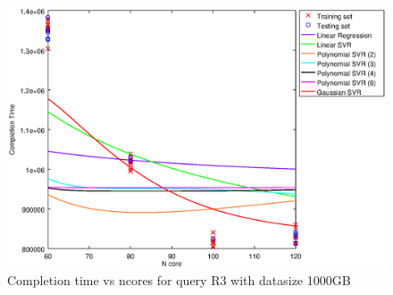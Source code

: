 
\begin {figure}[hbtp]
\centering
\includegraphics[width=\textwidth]{output/R3_1000_1_OVER_NCORES/plot_R3_1000.eps}
\caption{Completion time vs ncores for query R3 with datasize 1000GB}
\label{fig:all_nonlinear_R3_1000}
\end {figure}
